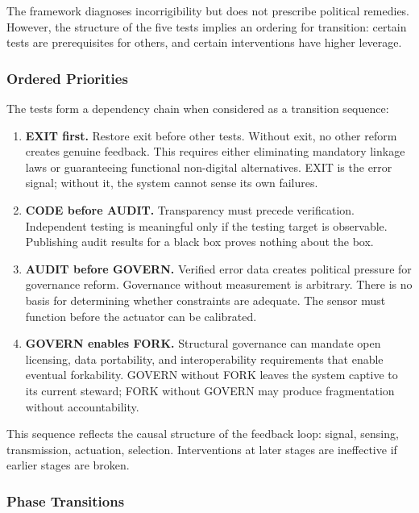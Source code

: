 The framework diagnoses incorrigibility but does not prescribe political remedies. However, the structure of the five tests implies an ordering for transition: certain tests are prerequisites for others, and certain interventions have higher leverage.

\subsubsection{Ordered Priorities}

The tests form a dependency chain when considered as a transition sequence:

\begin{enumerate}
    \item \textbf{EXIT first.} Restore exit before other tests. Without exit, no other reform creates genuine feedback. This requires either eliminating mandatory linkage laws or guaranteeing functional non-digital alternatives. EXIT is the error signal; without it, the system cannot sense its own failures.

    \item \textbf{CODE before AUDIT.} Transparency must precede verification. Independent testing is meaningful only if the testing target is observable. Publishing audit results for a black box proves nothing about the box.

    \item \textbf{AUDIT before GOVERN.} Verified error data creates political pressure for governance reform. Governance without measurement is arbitrary. There is no basis for determining whether constraints are adequate. The sensor must function before the actuator can be calibrated.

    \item \textbf{GOVERN enables FORK.} Structural governance can mandate open licensing, data portability, and interoperability requirements that enable eventual forkability. GOVERN without FORK leaves the system captive to its current steward; FORK without GOVERN may produce fragmentation without accountability.
\end{enumerate}

This sequence reflects the causal structure of the feedback loop: signal, sensing, transmission, actuation, selection. Interventions at later stages are ineffective if earlier stages are broken.

\subsubsection{Phase Transitions}

